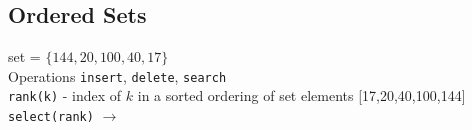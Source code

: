 \subsection*{Ordered Sets}

\noindent set = $\{144, 20, 100, 40, 17\}$\\
Operations \texttt{insert}, \texttt{delete}, \texttt{search}\\
\texttt{rank(k)} - index of $k$ in a sorted ordering of set elements [17,20,40,100,144] \\
\texttt{select(rank)} $\rightarrow$ 


